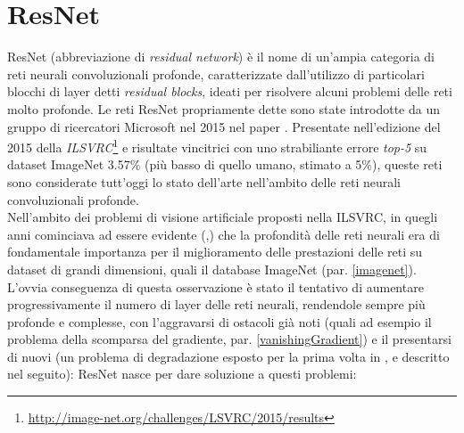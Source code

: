 \section{ResNet}
\label{resnet}
ResNet (abbreviazione di \textit{residual network}) è il nome di un'ampia categoria di reti neurali convoluzionali profonde, caratterizzate dall'utilizzo di particolari blocchi di layer detti \textit{residual blocks}, ideati per risolvere alcuni problemi delle reti molto profonde.
Le reti ResNet propriamente dette sono state introdotte da un gruppo di ricercatori Microsoft nel 2015 nel paper \cite{resnet}. Presentate nell'edizione del 2015 della \textit{ILSVRC}\footnote{\url{http://image-net.org/challenges/LSVRC/2015/results}} e risultate vincitrici con uno strabiliante errore \textit{top-5} su dataset ImageNet 3.57\% (più basso di quello umano, stimato a 5\%), queste reti sono considerate tutt'oggi lo stato dell'arte nell'ambito delle reti neurali convoluzionali profonde.\\

Nell'ambito dei problemi di visione artificiale proposti nella ILSVRC, in quegli anni cominciava ad essere evidente (\cite{googlenet},\cite{verydeep}) che la profondità delle reti neurali era di fondamentale importanza per il miglioramento delle prestazioni delle reti su dataset di grandi dimensioni, quali il database ImageNet (par. \ref{imagenet}).
L'ovvia conseguenza di questa osservazione è stato il tentativo di aumentare progressivamente il numero di layer delle reti neurali, rendendole sempre più profonde e complesse, con l'aggravarsi di ostacoli già noti (quali ad esempio il problema della scomparsa del gradiente, par. \ref{vanishingGradient}) e il presentarsi di nuovi (un problema di degradazione esposto per la prima volta in \cite{highway}, e descritto nel seguito):
ResNet nasce per dare soluzione a questi problemi:

